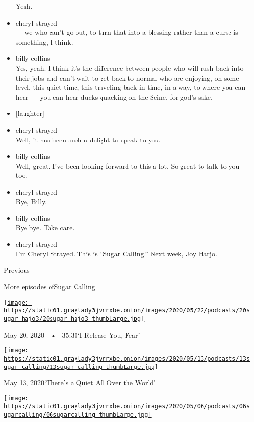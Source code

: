 \begin{itemize}
  Yeah.
\item
  cheryl strayed\\
  --- we who can't go out, to turn that into a blessing rather than a
  curse is something, I think.
\item
  billy collins\\
  Yes, yeah. I think it's the difference between people who will rush
  back into their jobs and can't wait to get back to normal who are
  enjoying, on some level, this quiet time, this traveling back in time,
  in a way, to where you can hear --- you can hear ducks quacking on the
  Seine, for god's sake.
\item
  {[}laughter{]}
\item
  cheryl strayed\\
  Well, it has been such a delight to speak to you.
\item
  billy collins\\
  Well, great. I've been looking forward to this a lot. So great to talk
  to you too.
\item
  cheryl strayed\\
  Bye, Billy.
\item
  billy collins\\
  Bye bye. Take care.
\item
  cheryl strayed\\
  I'm Cheryl Strayed. This is ``Sugar Calling.'' Next week, Joy Harjo.
\end{itemize}

Previous

More episodes ofSugar Calling

\href{https://www.nytimes3xbfgragh.onion/2020/05/20/podcasts/sugar-calling-joy-harjo-poetry-virus.html?action=click\&module=audio-series-bar\&region=header\&pgtype=Article}{\texttt{[image: https://static01.graylady3jvrrxbe.onion/images/2020/05/22/podcasts/20sugar-hajo3/20sugar-hajo3-thumbLarge.jpg]}}

May 20, 2020~~•~ 35:30`I Release You, Fear'

\href{https://www.nytimes3xbfgragh.onion/2020/05/13/podcasts/sugar-calling-billy-collins-poetry-virus.html?action=click\&module=audio-series-bar\&region=header\&pgtype=Article}{\texttt{[image: https://static01.graylady3jvrrxbe.onion/images/2020/05/13/podcasts/13sugar-calling/13sugar-calling-thumbLarge.jpg]}}

May 13, 2020`There's a Quiet All Over the World'

\href{https://www.nytimes3xbfgragh.onion/2020/05/06/podcasts/sugar-calling-alice-walker-quarantine-virus.html?action=click\&module=audio-series-bar\&region=header\&pgtype=Article}{\texttt{[image: https://static01.graylady3jvrrxbe.onion/images/2020/05/06/podcasts/06sugarcalling/06sugarcalling-thumbLarge.jpg]}}

